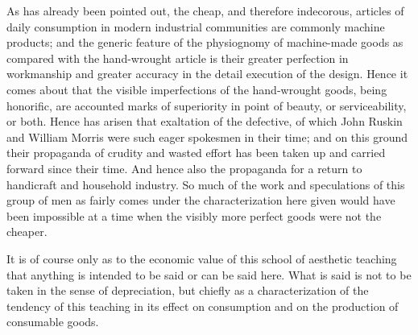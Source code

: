 \documentclass[12pt]{report}
\begin{document}
As has already been pointed out, the cheap, and therefore indecorous,
articles of daily consumption in modern industrial communities are
commonly machine products; and the generic feature of the physiognomy
of machine-made goods as compared with the hand-wrought article is their
greater perfection in workmanship and greater accuracy in the detail
execution of the design. Hence it comes about that the visible
imperfections of the hand-wrought goods, being honorific, are accounted
marks of superiority in point of beauty, or serviceability, or both.
Hence has arisen that exaltation of the defective, of which John Ruskin
and William Morris were such eager spokesmen in their time; and on this
ground their propaganda of crudity and wasted effort has been taken up
and carried forward since their time. And hence also the propaganda for
a return to handicraft and household industry. So much of the work
and speculations of this group of men as fairly comes under the
characterization here given would have been impossible at a time when
the visibly more perfect goods were not the cheaper.

It is of course only as to the economic value of this school of
aesthetic teaching that anything is intended to be said or can be said
here. What is said is not to be taken in the sense of depreciation, but
chiefly as a characterization of the tendency of this teaching in its
effect on consumption and on the production of consumable goods.
\end{document}
